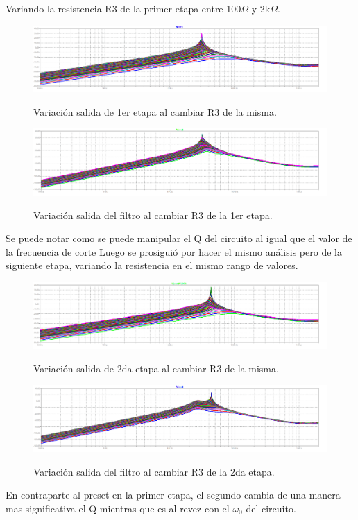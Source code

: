 Variando la resistencia R3 de la primer etapa entre 100$\Omega$ y 2k$\Omega$.  
\begin{figure}[H]
	\centering
	\includegraphics[width=\textwidth]{Imagenes-Ej2/presetE1.png}
	\label{fig:graph}
	\caption{Variación salida de 1er etapa al cambiar R3 de la misma.}
\end{figure}
\begin{figure}[H]
	\centering
	\includegraphics[width=\textwidth]{Imagenes-Ej2/presetEFE1.png}
	\label{fig:graph}
	\caption{Variación salida del filtro al cambiar R3 de la 1er etapa.}
\end{figure}
Se puede notar como se puede manipular el Q del circuito al igual que el valor de la frecuencia de corte
Luego se prosiguió por hacer el mismo análisis pero de la siguiente etapa, variando la resistencia en el mismo rango de valores.
\begin{figure}[H]
	\centering
	\includegraphics[width=\textwidth]{Imagenes-Ej2/presetE2.png}
	\label{fig:graph}
	\caption{Variación salida de 2da etapa al cambiar R3 de la misma.}
\end{figure}
\begin{figure}[H]
	\centering
	\includegraphics[width=\textwidth]{Imagenes-Ej2/presetEFE2.png}
	\label{fig:graph}
	\caption{Variación salida del filtro al cambiar R3 de la 2da etapa.}
\end{figure}
En contraparte al preset en la primer etapa, el segundo cambia de una manera mas significativa el Q mientras que es al revez con el $\omega_0$ del circuito.
